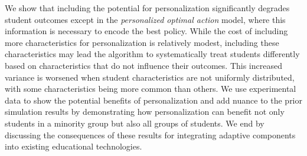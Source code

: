 We show that including the potential for personalization significantly degrades student outcomes except in the \textit{personalized optimal action} model, where this information is necessary to encode the best policy. 
While the cost of including more characteristics for personalization is relatively modest, including these characteristics may lead the algorithm to systematically treat students differently based on characteristics that do not influence their outcomes. This increased variance is worsened when student characteristics are not uniformly distributed, with some characteristics being more common than others.
We use experimental data to show the potential benefits of personalization and add nuance to the prior simulation results by demonstrating how personalization can benefit not only students in a minority group but also all groups of students.
We end by discussing the consequences of these results for integrating adaptive components into existing educational technologies.


